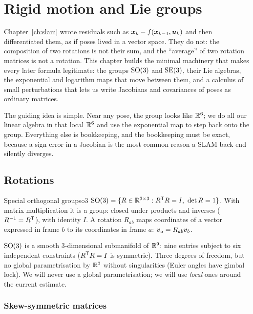 \chapter{Rigid motion and Lie groups}
\label{ch:rigid}

Chapter~\ref{ch:slam} wrote residuals such as $\bm{x}_k-f(\bm{x}_{k-1},\bm{u}_k)$ and
then differentiated them, as if poses lived in a vector space. They do
not: the composition of two rotations is not their sum, and the
``average'' of two rotation matrices is not a rotation. This chapter
builds the minimal machinery that makes every later formula legitimate:
the groups $\mathrm{SO}(3)$ and $\mathrm{SE}(3)$, their Lie algebras, the exponential and
logarithm maps that move between them, and a calculus of small
perturbations that lets us write Jacobians and covariances of poses as
ordinary matrices.

The guiding idea is simple. Near any pose, the group looks like
$\mathbb{R}^6$; we do all our linear algebra in that local $\mathbb{R}^6$ and use the
exponential map to step back onto the group. Everything else is
bookkeeping, and the bookkeeping must be exact, because a sign error in a
Jacobian is the most common reason a SLAM back-end silently diverges.

\section{Rotations}

\begin{definition}{Special orthogonal group}{so3}
$\mathrm{SO}(3)=\{R\in\mathbb{R}^{3\times3}: R^{\mathsf{T}} R=I,\ \det R=1\}$. With matrix
multiplication it is a group: closed under products and inverses
($R^{-1}=R^{\mathsf{T}}$), with identity $I$. A rotation $R_{ab}$ maps coordinates
of a vector expressed in frame $b$ to its coordinates in frame $a$:
$\bm{v}_a=R_{ab}\bm{v}_b$.
\end{definition}

$\mathrm{SO}(3)$ is a smooth 3-dimensional submanifold of $\mathbb{R}^{9}$: nine entries
subject to six independent constraints ($R^{\mathsf{T}} R=I$ is symmetric). Three
degrees of freedom, but no global parametrisation by $\mathbb{R}^3$ without
singularities (Euler angles have gimbal lock). We will never use a
global parametrisation; we will use \emph{local} ones around the current
estimate.

\subsection{Skew-symmetric matrices}

